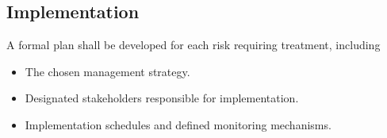 \subsection*{Implementation}
A formal plan shall be developed for each risk requiring treatment, including
\begin{itemize}
    \item The chosen management strategy.
    \item Designated stakeholders responsible for implementation.
    \item Implementation schedules and defined monitoring mechanisms.
\end{itemize}


